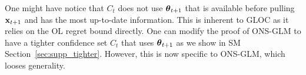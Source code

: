 One might have notice that $C_t$ does not use ${{\boldsymbol \theta}}_{t+1}$ that is available before pulling $\mathbf{x}_{t+1}$ and has the most up-to-date information.
This is inherent to GLOC as it relies on the OL regret bound directly.
One can modify the proof of ONS-GLM to have a tighter confidence set $C_t$ that uses ${{\boldsymbol \theta}}_{t+1}$ as we show in SM Section~\ref{sec:supp_tighter}.
However, this is now specific to ONS-GLM, which looses generality. 

